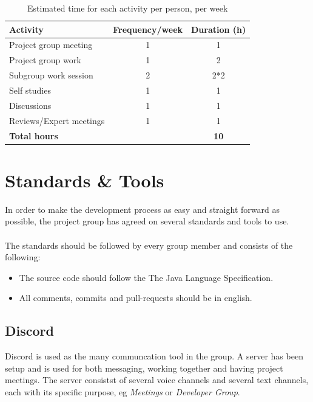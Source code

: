 \documentclass{article}
\begin{document}
        \begin{table}[h]
            \centering
            \begin{tabular}{|l|c|c|}
                \hline
                    \textbf{Activity} & \textbf{Frequency/week} & \textbf{Duration (h)} \\
                \hline
                    Project group meeting & 1 & 1 \\
                 \hline
                    Project group work & 1 & 2 \\
                 \hline
                    Subgroup work session & 2 & 2*2 \\
                 \hline
                    Self studies & 1  & 1 \\
                 \hline
                    Discussions & 1 & 1 \\
                 \hline
                    Reviews/Expert meetings & 1 & 1 \\
                 \hline
                    \textbf{Total hours} & & \textbf{10} \\
                 \hline
            \end{tabular}
            \caption{Estimated time for each activity per person, per week}
            \label{activitytable}
        \end{table}
    

\section{Standards \& Tools}    %
    In order to make the development process as easy and straight forward as possible,
    the project group has agreed on several standards and tools to use. 
    \\ \\
    The standards should be followed by every group member and consists of the following:
    \begin{itemize}
        \item The source code should follow the The Java Language Specification.
        \item All comments, commits and pull-requests should be in english.
    \end{itemize}
    
    \subsection{Discord}
    Discord is used as the many communcation tool in the group. A server has been setup and is
    used for both messaging, working together and having project meetings.
    The server consistst of several voice channels and several text channels, each
    with its specific purpose, eg \textit{Meetings} or \textit{Developer Group}.
    
\end{document}
